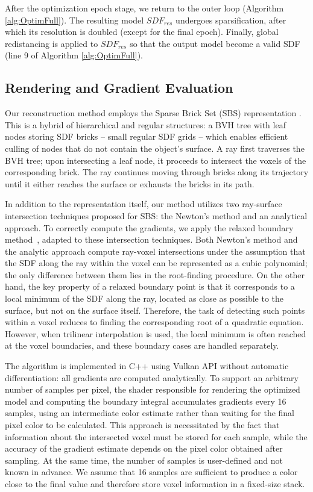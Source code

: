 \documentclass{ieeeaccess}
\begin{document}
After the optimization epoch stage, we return to the outer loop (Algorithm \ref{alg:OptimFull}). The resulting model $SDF_{res}$ undergoes sparsification, after which  its resolution is doubled (except for the final epoch). Finally, global redistancing is applied to $SDF_{res}$ so that the output model become a valid SDF (line 9 of Algorithm \ref{alg:OptimFull}).

\subsection{Rendering and Gradient Evaluation}

Our reconstruction method employs the Sparse Brick Set (SBS) representation \cite{HanssonSoderlund}. This is a hybrid of hierarchical and regular structures: a BVH tree with leaf nodes storing SDF bricks -- small regular SDF grids -- which enables efficient culling of nodes that do not contain the object's surface. A ray first traverses the BVH tree; upon intersecting a leaf node, it proceeds to intersect the voxels of the corresponding brick. The ray continues moving through bricks along its trajectory until it either reaches the surface or exhausts the bricks in its path.

In addition to the representation itself, our method utilizes two ray-surface intersection techniques proposed for SBS: the Newton's method and an analytical approach. To correctly compute the gradients, we apply the relaxed boundary method~\cite{RelaxBoundary}, adapted to these intersection techniques. Both Newton's method and the analytic approach compute ray-voxel intersections under the assumption that the SDF along the ray within the voxel can be represented as a cubic polynomial; the only difference between them lies in the root-finding procedure. On the other hand, the key property of a relaxed boundary point is that it corresponds to a local minimum of the SDF along the ray, located as close as possible to the surface, but not on the surface itself. Therefore, the task of detecting such points within a voxel reduces to finding the corresponding root of a quadratic equation. However, when trilinear interpolation is used, the local minimum is often reached at the voxel boundaries, and these boundary cases are handled separately.

The algorithm is implemented in C++ using Vulkan API without automatic differentiation: all gradients are computed analytically. To support an arbitrary number of samples per pixel, the shader responsible for rendering the optimized model and computing the boundary integral accumulates gradients every 16 samples, using an intermediate color estimate rather than waiting for the final pixel color to be calculated. This approach is necessitated by the fact that information about the intersected voxel must be stored for each sample, while the accuracy of the gradient estimate depends on the pixel color obtained after sampling. At the same time, the number of samples is user-defined and not known in advance. We assume that 16 samples are sufficient to produce a color close to the final value and therefore store voxel information in a fixed-size stack.
\end{document}
